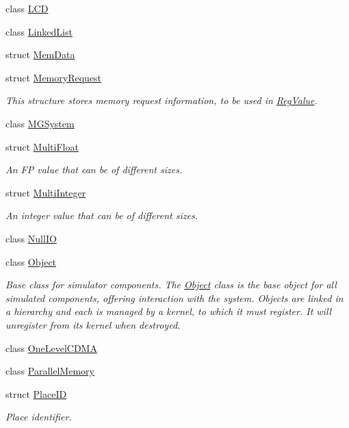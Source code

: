 \begin{DoxyCompactItemize}
class \hyperlink{class_simulator_1_1_l_c_d}{L\+C\+D}
\item 
class \hyperlink{class_simulator_1_1_linked_list}{Linked\+List}
\item 
struct \hyperlink{struct_simulator_1_1_mem_data}{Mem\+Data}
\item 
struct \hyperlink{struct_simulator_1_1_memory_request}{Memory\+Request}
\begin{DoxyCompactList}\small\item\em This structure stores memory request information, to be used in \hyperlink{struct_simulator_1_1_reg_value}{Reg\+Value}. \end{DoxyCompactList}\item 
class \hyperlink{class_simulator_1_1_m_g_system}{M\+G\+System}
\item 
struct \hyperlink{struct_simulator_1_1_multi_float}{Multi\+Float}
\begin{DoxyCompactList}\small\item\em An F\+P value that can be of different sizes. \end{DoxyCompactList}\item 
struct \hyperlink{struct_simulator_1_1_multi_integer}{Multi\+Integer}
\begin{DoxyCompactList}\small\item\em An integer value that can be of different sizes. \end{DoxyCompactList}\item 
class \hyperlink{class_simulator_1_1_null_i_o}{Null\+I\+O}
\item 
class \hyperlink{class_simulator_1_1_object}{Object}
\begin{DoxyCompactList}\small\item\em Base class for simulator components. The \hyperlink{class_simulator_1_1_object}{Object} class is the base object for all simulated components, offering interaction with the system. Objects are linked in a hierarchy and each is managed by a kernel, to which it must register. It will unregister from its kernel when destroyed. \end{DoxyCompactList}\item 
class \hyperlink{class_simulator_1_1_one_level_c_d_m_a}{One\+Level\+C\+D\+M\+A}
\item 
class \hyperlink{class_simulator_1_1_parallel_memory}{Parallel\+Memory}
\item 
struct \hyperlink{struct_simulator_1_1_place_i_d}{Place\+I\+D}
\begin{DoxyCompactList}\small\item\em Place identifier. \end{DoxyCompactList}\item 

\end{DoxyCompactItemize}
